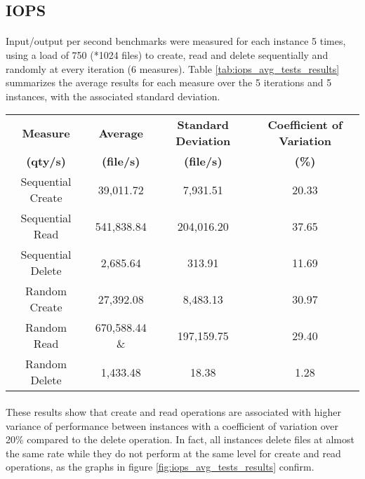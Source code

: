 \documentclass[11pt]{article}
\begin{document}
	\subsection{IOPS}
		\paragraph{} Input/output per second benchmarks were measured for each instance 5 times, using a
		load of 750 (*1024 files) to create, read and delete sequentially and
		randomly at every iteration (6 measures). Table \ref{tab:iops_avg_tests_results} summarizes the
		average results for each measure over the 5 iterations and 5 instances, with
		the associated standard deviation.
	
		\begin{minipage}{\textwidth}
		\begin{center}
			 \label{tab:iops_avg_tests_results}	
			\begin{tabular}{|*{4}{c|}}
				\hline
				\textbf{Measure} & \textbf{Average} & \textbf{Standard Deviation} & \textbf{Coefficient of Variation} \\
				\textbf{(qty/s)} & \textbf{(file/s)} & \textbf{(file/s)} & \textbf{(\%)} \\
				\hline
				Sequential Create & 39,011.72 & 7,931.51 & 20.33 \\
				\hline
				Sequential Read & 541,838.84 & 204,016.20 & 37.65 \\
				\hline
				Sequential Delete & 2,685.64 & 313.91 & 11.69 \\
				\hline
				Random Create & 27,392.08 & 8,483.13 & 30.97 \\
				\hline
				Random Read & 670,588.44 \& & 197,159.75 & 29.40 \\
				\hline
				Random Delete & 1,433.48 & 18.38 & 1.28 \\
				\hline
			\end{tabular}
		\end{center}
		\end{minipage}

		\paragraph{} These results show that create and read operations are
		associated with higher variance of performance between instances with a
		coefficient of variation over 20\% compared to the delete operation. In
		fact, all instances delete files at almost the same rate while they do
		not perform at the same level for create and read operations, as the
		graphs in figure \ref{fig:iops_avg_tests_results} confirm.
\end{document}
